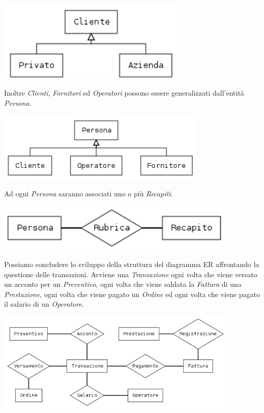 		\begin{center}
			\includegraphics[width=9cm]{images/diagrams/cliente.png}
		\end{center}
		
		Inoltre \emph{Clienti}, \emph{Fornitori} ed \emph{Operatori} possono essere generalizzati dall'entità \emph{Persona}.
		
		\begin{center}
			\includegraphics[width=10cm]{images/diagrams/persona.png}
		\end{center}
		
		Ad ogni \emph{Persona} saranno associati uno o più \emph{Recapiti}.
		
		\includegraphics[width=11.5cm]{images/diagrams/persona_recapito.png}
		
		Possiamo concludere lo sviluppo della struttura del diagramma ER affrontando la questione delle transazioni. Avviene una \emph{Transazione} ogni volta che viene versato un acconto per un \emph{Preventivo}, ogni volta che viene saldata la \emph{Fattura} di una \emph{Prestazione}, ogni volta che viene pagato un \emph{Ordine} ed ogni volta che viene pagato il salario di un \emph{Operatore}.

		\includegraphics[width=11.5cm]{images/diagrams/transazione.png}
		
